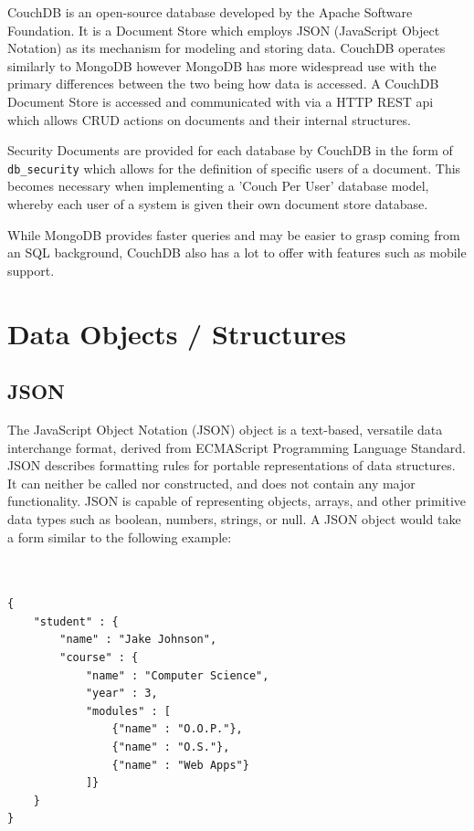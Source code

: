 CouchDB\cite{couchdb} is an open-source database developed by the Apache Software Foundation. It is a Document Store\cite{docStore} which employs JSON (JavaScript Object Notation) as its mechanism for modeling and storing data. CouchDB operates similarly to MongoDB however MongoDB has more widespread use\cite{dbranking} with the primary differences between the two being how data is accessed. A CouchDB Document Store is accessed and communicated with via a HTTP REST api\cite{couchapi} which allows CRUD actions on documents and their internal structures.

Security Documents are provided for each database by CouchDB in the form of \texttt{\/db\/\_security} which allows for the definition of specific users of a document. This becomes necessary when implementing a 'Couch Per User' database model, whereby each user of a system is given their own document store database.

While MongoDB provides faster queries and may be easier to grasp coming from an SQL background, CouchDB also has a lot to offer with features such as mobile support\cite{couchvsmongo}.

\section{Data Objects / Structures}
\subsection{JSON}
	The JavaScript Object Notation (JSON) object is a text-based, versatile data interchange format, derived from ECMAScript Programming Language Standard. JSON describes formatting rules for portable representations of data structures\cite{crockford}. It can neither be called nor constructed, and does not contain any major functionality\cite{ecma}. JSON is capable of representing objects, arrays, and other primitive data types such as boolean, numbers, strings, or null\cite{crockford}.  A JSON object would take a form similar to the following example:
\\
\\
\\
\begin{verbatim}
{
	"student" : {
		"name" : "Jake Johnson",
		"course" : {
			"name" : "Computer Science",
			"year" : 3,
			"modules" : [ 
				{"name" : "O.O.P."},
				{"name" : "O.S."},
				{"name" : "Web Apps"} 
			]}
	}
}
\end{verbatim}
